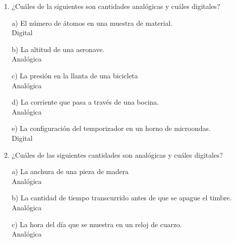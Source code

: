 \documentclass[a4paper, 12pt]{article}
\newcommand{\Aspace}{0.2cm}
\begin{document}
    \begin{enumerate}
        \item ¿Cuáles de la siguientes son cantidades analógicas y cuáles digitales? \par
            \vspace{\Aspace} \par
            a) El número de átomos en una muestra de material.
            \\ { \color{azul} Digital }

            \vspace{\Aspace} \par
            b) La altitud de una aeronave.
            \\ { \color{azul} Analógica }

            \vspace{\Aspace} \par
            c) La presión en la llanta de una bicicleta
            \\ { \color{azul} Analógica }

            \vspace{\Aspace} \par
            d) La corriente que pasa a través de una bocina.
            \\ { \color{azul} Analógica }

            \vspace{\Aspace} \par
            e) La configuración del temporizador en un horno de microondas.
            \\ { \color{azul} Digital }


        \item ¿Cuáles de las siguientes cantidades son analógicas y cuáles digitales? \par          
            \vspace{\Aspace} \par
            a) La anchura de una pieza de madera
            \\ { \color{azul} Analógica }

            \vspace{\Aspace} \par
            b) La cantidad de tiempo transcurrido antes de que se apague el timbre.
            \\ { \color{azul} Analógica }

            \vspace{\Aspace} \par
            c) La hora del día que se muestra en un reloj de cuarzo.
            \\ { \color{azul} Analógica }


\end{enumerate}
\end{document}

